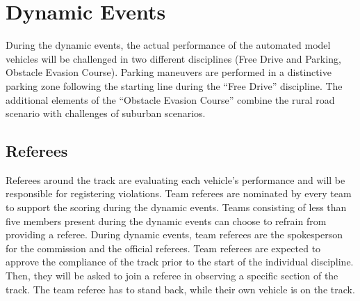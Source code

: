 \chapter{Dynamic Events}

During the dynamic events, the actual performance of the automated model
vehicles will be challenged in two different disciplines (Free Drive and
Parking, Obstacle Evasion Course). Parking maneuvers are performed in a
distinctive parking zone following the starting line during the “Free Drive”
discipline. The additional elements of the “Obstacle Evasion Course” combine
the rural road scenario with challenges of suburban scenarios.

\section{Referees}

Referees around the track are evaluating each vehicle’s performance and will be
responsible for registering violations. Team referees are nominated by every
team to support the scoring during the dynamic events. Teams consisting of less
than five members present during the dynamic events can choose to refrain from
providing a referee. During dynamic events, team referees are the spokesperson
for the commission and the official referees. Team referees are expected to
approve the compliance of the track prior to the start of the individual
discipline. Then, they will be asked to join a referee in observing a specific
section of the track. The team referee has to stand back, while their own
vehicle is on the track.


